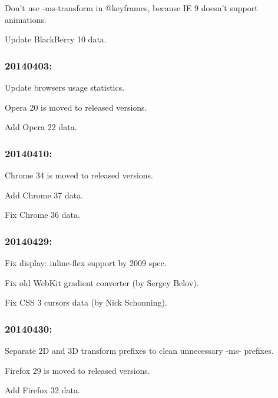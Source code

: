 \begin{DoxyItemize}
\item Don’t use {\ttfamily -\/ms-\/transform} in {\ttfamily @keyframes}, because IE 9 doesn’t support animations.
\item Update Black\+Berry 10 data.
\end{DoxyItemize}

\subsubsection*{20140403\+:}


\begin{DoxyItemize}
\item Update browsers usage statistics.
\item Opera 20 is moved to released versions.
\item Add Opera 22 data.
\end{DoxyItemize}

\subsubsection*{20140410\+:}


\begin{DoxyItemize}
\item Chrome 34 is moved to released versions.
\item Add Chrome 37 data.
\item Fix Chrome 36 data.
\end{DoxyItemize}

\subsubsection*{20140429\+:}


\begin{DoxyItemize}
\item Fix {\ttfamily display\+: inline-\/flex} support by 2009 spec.
\item Fix old Web\+Kit gradient converter (by Sergey Belov).
\item Fix C\+SS 3 cursors data (by Nick Schonning).
\end{DoxyItemize}

\subsubsection*{20140430\+:}


\begin{DoxyItemize}
\item Separate 2D and 3D transform prefixes to clean unnecessary {\ttfamily -\/ms-\/} prefixes.
\item Firefox 29 is moved to released versions.
\item Add Firefox 32 data.
\end{DoxyItemize}

